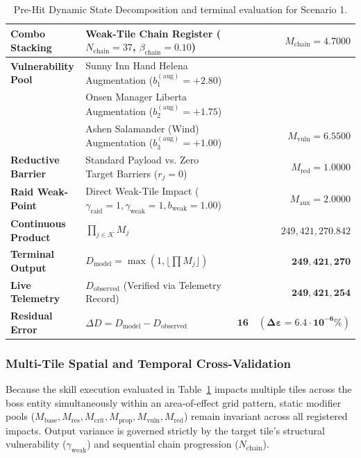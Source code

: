 \documentclass[twocolumn,10pt]{article}
\begin{document}
\begin{table}[H]
\begin{tabular}{llrr}
\midrule
\textbf{Combo Stacking} 
  & Weak-Tile Chain Register ($N_{\text{chain}} = 37$, $\beta_{\text{chain}} = 0.10$) & & \textbf{$M_{\text{chain}} = 4.7000$} \\
\midrule
\textbf{Vulnerability Pool} 
  & Sunny Inn Hand Helena Augmentation ($b_1^{(\text{aug})} = +2.80$) & & \\
  & Onsen Manager Liberta Augmentation ($b_2^{(\text{aug})} = +1.75$) & & \\
  & Ashen Salamander (Wind) Augmentation ($b_3^{(\text{aug})} = +1.00$) & & \textbf{$M_{\text{vuln}} = 6.5500$} \\
\midrule
\textbf{Reductive Barrier} 
  & Standard Payload vs. Zero Target Barriers ($r_j = 0$) & & \textbf{$M_{\text{red}} = 1.0000$} \\
\midrule
\textbf{Raid Weak-Point} 
  & Direct Weak-Tile Impact ($\gamma_{\text{raid}} = 1, \gamma_{\text{weak}} = 1, b_{\text{weak}} = 1.00$) & & \textbf{$M_{\text{aux}} = 2.0000$} \\
\midrule\midrule
\textbf{Continuous Product} 
  & $\prod_{j \in \mathcal{K}} M_j$ & \multicolumn{2}{r}{$249,421,270.842$} \\
\textbf{Terminal Output} 
  & $D_{\text{model}} = \max(1, \lfloor \prod M_j \rfloor)$ & \multicolumn{2}{r}{$\mathbf{249,421,270}$} \\
\textbf{Live Telemetry} 
  & $D_{\text{observed}}$ (Verified via Telemetry Record) & \multicolumn{2}{r}{$\mathbf{249,421,254}$} \\
\midrule
\textbf{Residual Error} 
  & $\Delta D = D_{\text{model}} - D_{\text{observed}}$ & \multicolumn{2}{r}{$\mathbf{16 \quad (\Delta \varepsilon = 6.4 \cdot 10^{-6}\%)}$} \\
\bottomrule
\end{tabular}
\caption{Pre-Hit Dynamic State Decomposition and terminal evaluation for Scenario 1.}
\label{tab:prehit_resolution}
\end{table}

\subsubsection{Multi-Tile Spatial and Temporal Cross-Validation}
Because the skill execution evaluated in Table~\ref{tab:prehit_resolution} impacts multiple tiles across the boss entity simultaneously within an area-of-effect grid pattern, static modifier pools ($M_{\text{base}}, M_{\text{res}}, M_{\text{crit}}, M_{\text{prop}}, M_{\text{vuln}}, M_{\text{red}}$) remain invariant across all registered impacts. Output variance is governed strictly by the target tile's structural vulnerability ($\gamma_{\text{weak}}$) and sequential chain progression ($N_{\text{chain}}$).
\end{document}
